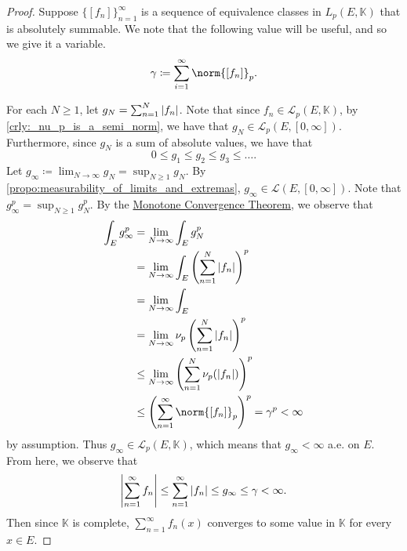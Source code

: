 \documentclass[notoc,notitlepage]{tufte-book}
\begin{document}
\begin{proof}
  Suppose $\{ [f_n] \}_{n=1}^{\infty}$ is a sequence of equivalence classes in
  $L_p(E, \mathbb{K})$ that is absolutely summable. We note that the following
  value will be useful, and so we give it a variable.
  \begin{equation*}
    \gamma \coloneqq \sum_{i=1}^{\infty} \norm{[f_n]}_p.
  \end{equation*}

  \noindent
   For
  each $N \geq 1$, let $g_N = \sum_{n=1}^{N} \left|f_n\right|$. Note that since $f_n
  \in \mathcal{L}_p(E, \mathbb{K})$, by \cref{crly:_nu_p_is_a_semi_norm}, we
  have that $g_N \in \mathcal{L}_p(E, [0, \infty])$. Furthermore, since $g_N$ is
  a sum of absolute values, we have that
  \begin{equation*}
    0 \leq g_1 \leq g_2 \leq g_3 \leq \hdots.
  \end{equation*}
  Let $g_\infty \coloneqq \lim_{N \to \infty} g_N = \sup_{N \geq 1} g_N$. By
  \cref{propo:measurability_of_limits_and_extremas}, $g_\infty \in
  \mathcal{L}(E, [0, \infty])$.  Note that $g_\infty^p = \sup_{N \geq 1} g_N^p$. By the
  \hyperref[thm:the_monotone_convergence_theorem]{Monotone Convergence Theorem},
  we observe that
  \begin{align*}
    \int_{E} g_\infty^p &= \lim_{N \to \infty} \int_{E} g_N^p \\
                        &= \lim_{N \to \infty} \int_{E} \left(\sum_{n=1}^{N}
                          \abs{f_n}\right)^p \\
                        &= \lim_{N \to \infty} \int_{E} \\
                        &= \lim_{N \to \infty} \nu_p \left( \sum_{n=1}^{N}
                          \abs{f_n} \right)^p \\
                        &\leq \lim_{N \to \infty} \left(\sum_{n=1}^{N}
                          \nu_p(\abs{f_n})\right)^p \\
                        &\leq \left( \sum_{n=1}^{\infty} \norm{[f_n]}_p
                          \right)^p = \gamma^p < \infty
  \end{align*}
  by assumption. Thus $g_\infty \in \mathcal{L}_p(E, \mathbb{K})$, which means
  that $g_\infty < \infty$ a.e. on $E$. From here, we observe that
  \begin{equation*}
    \left| \sum_{n=1}^{\infty} f_n \right| \leq \sum_{n=1}^{\infty} \left|f_n\right| \leq
    g_\infty \leq \gamma < \infty.
  \end{equation*}
  Then since $\mathbb{K}$ is complete, $\sum_{n=1}^{\infty} f_n(x)$ converges to
  some value in $\mathbb{K}$ for every $x \in E$. 


\end{proof}
\end{document}
